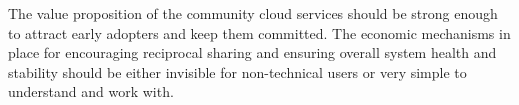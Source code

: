 %
%
%
The value proposition of the community cloud services should be strong enough to attract early adopters and keep them committed.
The economic mechanisms in place for encouraging reciprocal sharing and ensuring overall system health and stability should be either invisible for non-technical users or very simple to understand and work with.


